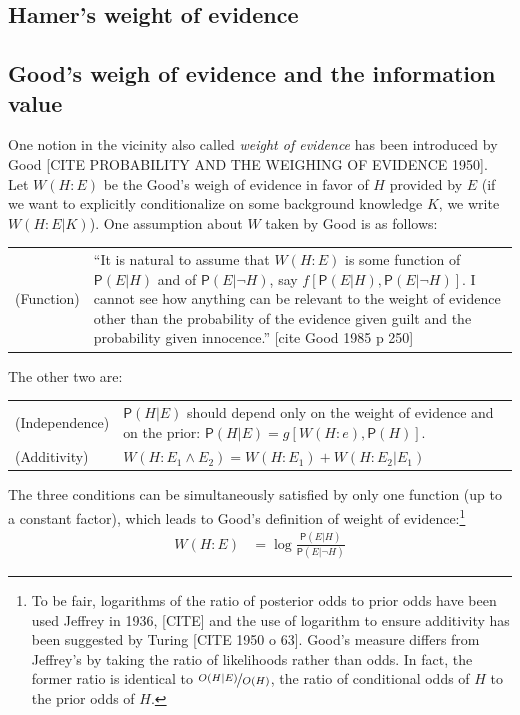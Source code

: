 \documentclass[
  10pt,
  dvipsnames,enabledeprecatedfontcommands]{scrartcl}
\newcommand{\pr}[1]{\mathsf{P}(#1)}
\begin{document}
\hypertarget{hamers-weight-of-evidence}{%
\subsection{Hamer's weight of
evidence}\label{hamers-weight-of-evidence}}

\hypertarget{goods-weigh-of-evidence-and-the-information-value}{%
\subsection{Good's weigh of evidence and the information
value}\label{goods-weigh-of-evidence-and-the-information-value}}

One notion in the vicinity also called \emph{weight of evidence} has
been introduced by Good {[}CITE PROBABILITY AND THE WEIGHING OF EVIDENCE
1950{]}. Let \(W(H:E)\) be the Good's weigh of evidence in favor of
\(H\) provided by \(E\) (if we want to explicitly conditionalize on some
background knowledge \(K\), we write \(W(H:E\vert K)\)). One assumption
about \(W\) taken by Good is as
follows:

\begin{tabular}{lp{11cm}}
(Function) & ``It is natural to assume that $W(H:E)$ is some function of $\pr{E\vert H}$ and of $\pr{E\vert \neg H}$, say $f[\pr{E\vert H}, \pr{E \vert \neg H}]$. I cannot see how anything can be relevant to the weight of evidence other than the probability of the evidence given guilt and the probability given innocence.'' [cite Good 1985 p 250]
\end{tabular}

The other two are:

\begin{tabular}{lp{11cm}}
(Independence) & $\pr{H\vert E} $ should depend only on the weight of evidence and on the prior: $\pr{H \vert E} = g[W(H:e), \pr{H}]$.\\
(Additivity)  & $W(H: E_1 \wedge E_2)  = W(H:E_1) + W(H:E_2 \vert E_1)$
\end{tabular}

\noindent The three conditions can be simultaneously satisfied by only
one function (up to a constant factor), which leads to Good's definition
of weight of evidence:\footnote{To be fair, logarithms of the ratio of
  posterior odds to prior odds have been used Jeffrey in 1936,
  {[}CITE{]} and the use of logarithm to ensure additivity has been
  suggested by Turing {[}CITE 1950 o 63{]}. Good's measure differs from
  Jeffrey's by taking the ratio of likelihoods rather than odds. In
  fact, the former ratio is identical to
  \(\nicefrac{O(H\vert E)}{O(H)}\), the ratio of conditional odds of
  \(H\) to the prior odds of \(H\).} \begin{align*}
W(H:E) & = \log \frac{\pr{E \vert H}}{\pr{E\vert \neg H}}
\end{align*}
\end{document}
